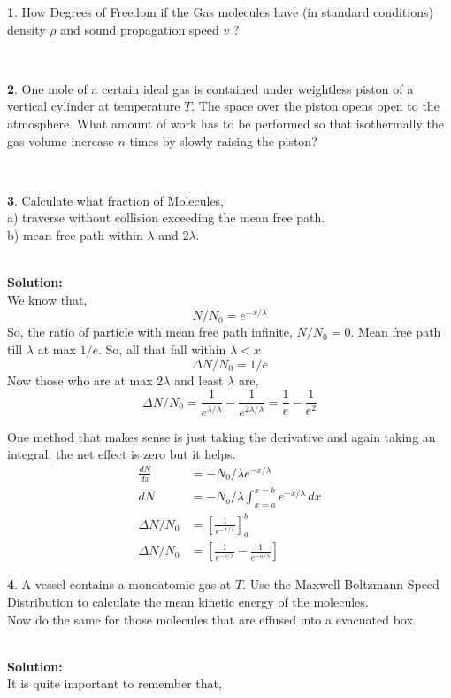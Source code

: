 \documentclass[a4paper]{article}
\theoremstyle{definition}
\newtheorem{prob}{ \framebox[0.09\textwidth]{{\sffamily Pr}} }
\newcommand{\pr}[1]{ \begin{tcolorbox} \begin{prob} 
    #1 
\end{prob} 
   \end{tcolorbox}\ 
   \\
 }
\begin{document}
\pr{How Degrees of Freedom if the Gas molecules
have (in standard conditions) density $\rho$ and sound propagation speed $v$ ?}

\pr{One mole of a certain ideal gas
is contained under weightless piston of a vertical cylinder at temperature $T$.
The space over the piston opens open to the atmosphere. What amount of work has to be performed so that
isothermally the gas volume increase  $n$ times by slowly raising the piston?}
\pr{Calculate what fraction of Molecules, \\
a) traverse without collision exceeding the mean free path. \\
b) mean free path within $\lambda$ and $2\lambda$.}
\textbf{Solution:} \\
We know that, 
\begin{equation}
N/N_0 = e^{- x/\lambda} 
\end{equation}
So, the ratio of particle with mean free path infinite, $N/N_0 = 0$. Mean free path till $\lambda$ at max $1/e$. So, all that fall within $ \lambda < x $
\[ \Delta N / N_0 = 1/e \]
Now those who are at max $2\lambda$ and least $\lambda$ are,
\[ \Delta N / N_0 = \frac{1}{e^{\lambda / \lambda}} -  \frac{1}{e^{2\lambda / \lambda}} = \frac{1}{e} - \frac{1}{e^2} \]

\begin{center}
\end{center} 
 One method that makes sense is just taking the derivative and again taking an integral, the net effect is zero but it helps.
 \begin{align*}
 \frac{dN}{dx} &= -N_0/ \lambda e^{-x/\lambda}\\
 dN &=  -N_o/\lambda \int_{x = a}^{x = b} e^{-x/\lambda} \, dx \\
 \Delta N/ N_0 &= \left[\frac{1}{e^{-x/\lambda}}\right]_{a}^{b}\\
 \Delta N/ N_0 &= \left[ \frac{1}{e^{-b/\lambda}} - \frac{1}{e^{-a/\lambda}} \right]
 \end{align*}
\pr{ A vessel contains a monoatomic gas at $T$. Use the Maxwell Boltzmann Speed Distribution to calculate the mean kinetic energy of the molecules. \\
Now do the same for those molecules that are effused into a evacuated box.}
\textbf{Solution:} \\  It is quite important to remember that, 
\end{document}
